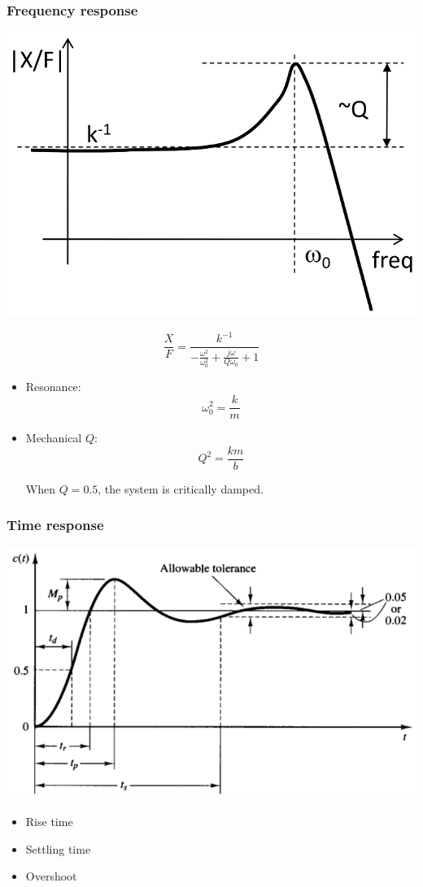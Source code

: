 \documentclass[11pt]{article}
\begin{document}
\subsubsection{Frequency response}
\label{sec:org322be1f}
\begin{center}
\includegraphics[width=.9\linewidth]{./images/second-order-systems-frequency-response-graph.png}
\end{center}
\[\frac{X}{F} = \frac{k^{-1}}{- \frac{\omega^2}{\omega_0^2} + \frac{j \omega}{Q \omega_0} + 1}\]
\begin{itemize}
\item Resonance:
\[\omega_0^2 = \frac{k}{m}\]
\item Mechanical \(Q\):
\[Q^2 = \frac{km}{b}\]

When \(Q = 0.5\), the system is critically damped.
\end{itemize}
\subsubsection{Time response}
\label{sec:orgb715dcb}
\begin{center}
\includegraphics[width=.9\linewidth]{./images/second-order-systems-time-response-graph.png}
\end{center}
\begin{itemize}
\item Rise time
\item Settling time
\item Overshoot
\end{itemize}
\end{document}
